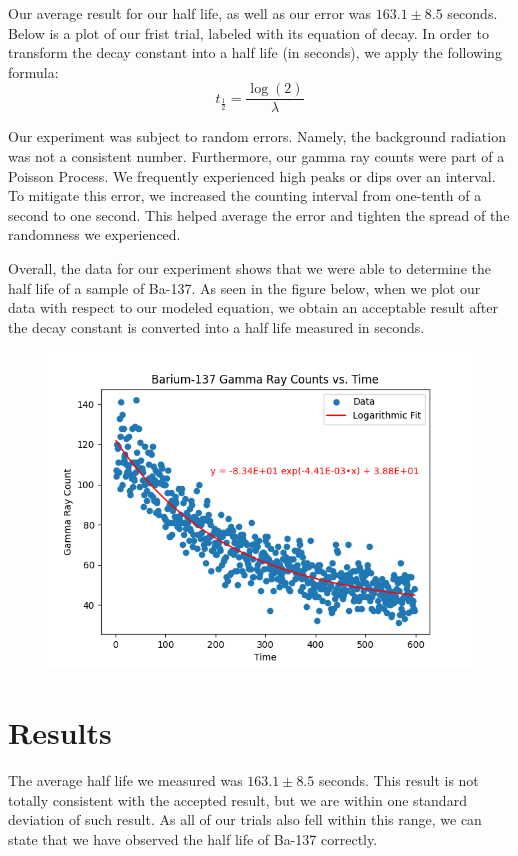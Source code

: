\documentclass[10pt,letterpaper,onecolumn]{article}
\begin{document}
Our average result for our half life, as well as our error was $163.1 \pm 8.5$ seconds.
Below is a plot of our frist trial, labeled with its equation of decay. In order to 
transform the decay constant into a half life (in seconds), we apply the following formula:
$$
t_{\frac{1}{2}} = \frac{\log(2)}{\lambda}
$$

Our experiment was subject to random errors. Namely, the background radiation was not
a consistent number. Furthermore, our gamma ray counts were part of a Poisson Process.
We frequently experienced high peaks or dips over an interval. To mitigate this error,
we increased the counting interval from one-tenth of a second to one second. This helped
average the error and tighten the spread of the randomness we experienced.

Overall, the data for our experiment shows that we were able to determine the 
half life of a sample of Ba-137. As seen in the figure below, when we plot our
data with respect to our modeled equation, we obtain an acceptable result after
the decay constant is converted into a half life measured in seconds. 
\begin{figure}[!htb]
  \centering
  \includegraphics[width=.9\textwidth]{../images/day3_liquidtrial3_plot.png}
\end{figure}

\newpage





\section{Results}

The average half life we measured was $163.1 \pm 8.5$ seconds. This result 
is not totally consistent with the accepted result, but we are within one 
standard deviation of such result. As all of our trials also fell within this
range, we can state that we have observed the half life of Ba-137 correctly.
\end{document}
